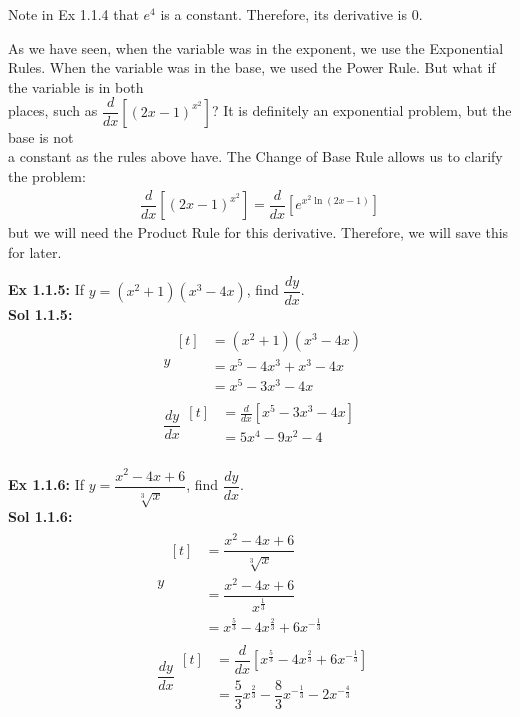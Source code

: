 \documentclass[11pt]{exam}
\newcommand{\diff}{\dfrac{d}{dx}}
\begin{document}
Note in Ex 1.1.4 that $e^4$ is a constant. Therefore, its derivative is $0$. \par
As we have seen, when the variable was in the exponent, we use the Exponential Rules. When the variable was in the base, we used the Power Rule. But what if the variable is in both \\[5.5pt] places, such as $\diff\left[(2x - 1)^{x^2}\right]$? It is definitely an exponential problem, but the base is not \\[5.5pt] a constant as the rules above have. The Change of Base Rule allows us to clarify the problem: \begin{align*}
    \diff\left[(2x - 1)^{x^2}\right] = \diff\left[e^{x^2\ln(2x - 1)}\right]
\end{align*} but we will need the Product Rule for this derivative. Therefore, we will save this for later.

\textbf{Ex 1.1.5:} If $y = (x^2 + 1)(x^3 - 4x)$, find $\dfrac{dy}{dx}$. \\[11pt]
\textbf{Sol 1.1.5:} \begin{align*}
    & y \begin{aligned}[t]
        & = (x^2 + 1)(x^3 - 4x) \\[11pt]
        & = x^5 - 4x^3 + x^3 - 4x \\[11pt]
        & = x^5 - 3x^3 - 4x
    \end{aligned} \\[11pt]
    & \dfrac{dy}{dx} \begin{aligned}[t]
        & = \frac{d}{dx}\left[x^5 - 3x^3 - 4x\right] \\[11pt]
        & = \boxed{5x^4 - 9x^2 - 4} \\
    \end{aligned}
\end{align*} 

\textbf{Ex 1.1.6:} If $y = \dfrac{x^2 - 4x + 6}{\sqrt[3]{x}}$, find $\dfrac{dy}{dx}$. \\[11pt]
\textbf{Sol 1.1.6:} \begin{align*}
    & y \begin{aligned}[t]
        & = \dfrac{x^2 - 4x + 6}{\sqrt[3]{x}} \\[11pt]
        & = \dfrac{x^2 - 4x + 6}{x^{\frac{1}{3}}} \\[11pt]
        & = x^{\frac{5}{3}} - 4x^{\frac{2}{3}} + 6x^{-\frac{1}{3}}
    \end{aligned} \\[11pt]
    & \dfrac{dy}{dx} \begin{aligned}[t]
        & = \diff\left[x^{\frac{5}{3}} - 4x^{\frac{2}{3}} + 6x^{-\frac{1}{3}}\right] \\[11pt]
        & = \boxed{\dfrac{5}{3}x^{\frac{2}{3}} - \dfrac{8}{3}x^{-\frac{1}{3}} - 2x^{-\frac{4}{3}}}
    \end{aligned}
\end{align*}
\end{document}

